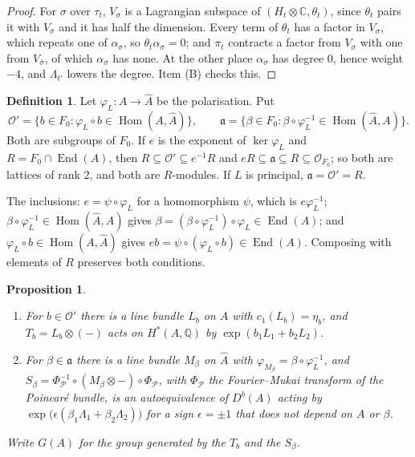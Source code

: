 \documentclass[11pt]{amsart}
\newtheorem{proposition}[theorem]{Proposition}
\theoremstyle{definition}
\newtheorem{definition}[theorem]{Definition}
\theoremstyle{remark}
\newcommand{\QQ}{\mathbb{Q}}
\newcommand{\CC}{\mathbb{C}}
\newcommand{\cO}{\mathcal{O}}
\newcommand{\fa}{\mathfrak{a}}
\newcommand{\Av}{\widehat{A}}
\newcommand{\Hom}{\operatorname{Hom}}
\newcommand{\End}{\operatorname{End}}
\newcommand{\bbar}{\overline}
\begin{document}
\begin{proof}
For $\sigma$ over $\tau_{t}$, $V_{\sigma}$ is a Lagrangian subspace of
$(H_{t}\otimes\CC,\theta_{t})$, since $\theta_{t}$ pairs it with
$V_{\bbar\sigma}$ and it has half the dimension. Every term of $\theta_{t}$
has a factor in $V_{\sigma}$, which repeats one of $\alpha_{\sigma}$, so
$\theta_{t}\alpha_{\sigma}=0$; and $\pi_{t}$ contracts a factor from
$V_{\sigma}$ with one from $V_{\bbar\sigma}$, of which $\alpha_{\sigma}$ has
none. At the other place $\alpha_{\sigma}$ has degree $0$, hence weight $-4$,
and $\Lambda_{t'}$ lowers the degree. Item (B) checks this.
\end{proof}

\begin{definition}\label{def:lattices}
Let $\varphi_{L}\colon A\to\Av$ be the polarisation. Put
\[
  \cO'=\{b\in F_{0}:\varphi_{L}\circ b\in\Hom(A,\Av)\},\qquad
  \fa=\{\beta\in F_{0}:\beta\circ\varphi_{L}^{-1}\in\Hom(\Av,A)\}.
\]
Both are subgroups of $F_{0}$. If $e$ is the exponent of $\ker\varphi_{L}$
and $R=F_{0}\cap\End(A)$, then $R\subseteq\cO'\subseteq e^{-1}R$ and
$eR\subseteq\fa\subseteq R\subseteq\cO_{F_{0}}$; so both are lattices of rank
$2$, and both are $R$-modules. If $L$ is principal, $\fa=\cO'=R$.
\end{definition}

The inclusions: $e=\psi\circ\varphi_{L}$ for a homomorphism $\psi$, which is
$e\varphi_{L}^{-1}$; $\beta\circ\varphi_{L}^{-1}\in\Hom(\Av,A)$ gives
$\beta=(\beta\circ\varphi_{L}^{-1})\circ\varphi_{L}\in\End(A)$; and
$\varphi_{L}\circ b\in\Hom(A,\Av)$ gives $eb=\psi\circ(\varphi_{L}\circ b)
\in\End(A)$. Composing with elements of $R$ preserves both conditions.

\begin{proposition}\label{prop:autoeq}
\begin{enumerate}[label=\textup{(\roman*)},leftmargin=2.4em,itemsep=2pt]
\item For $b\in\cO'$ there is a line bundle $L_{b}$ on $A$ with
  $c_{1}(L_{b})=\eta_{b}$, and $T_{b}=L_{b}\otimes(-)$ acts on $H^{*}(A,\QQ)$
  by $\exp(b_{1}L_{1}+b_{2}L_{2})$.
\item For $\beta\in\fa$ there is a line bundle $M_{\beta}$ on $\Av$ with
  $\varphi_{M_{\beta}}=\beta\circ\varphi_{L}^{-1}$, and
  $S_{\beta}=\Phi_{\mathcal{P}}^{-1}\circ(M_{\beta}\otimes-)\circ
  \Phi_{\mathcal{P}}$, with $\Phi_{\mathcal{P}}$ the Fourier--Mukai transform
  of the Poincar\'e bundle, is an autoequivalence of $D^{b}(A)$ acting by
  $\exp\bigl(\epsilon(\beta_{1}\Lambda_{1}+\beta_{2}\Lambda_{2})\bigr)$ for
  a sign $\epsilon=\pm1$ that does not depend on $A$ or $\beta$.
\end{enumerate}
Write $G(A)$ for the group generated by the $T_{b}$ and the $S_{\beta}$.
\end{proposition}
\end{document}
